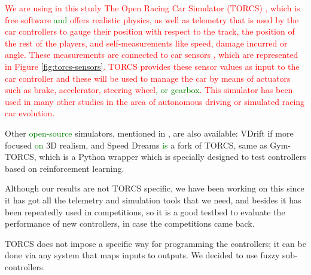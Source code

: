 \documentclass[10pt,journal,compsoc]{IEEEtran}
\begin{document}
\textcolor{red}{
We are using in this study The Open Racing Car Simulator (TORCS) \cite{torcs4}, which is free software \textcolor{green}{and} offers realistic physics, as well as telemetry that is used by the car controllers to gauge their position with respect to the track, the position of the rest of the players, and self-measurements like speed, damage incurred or angle. These measurements are connected to car sensors \cite{torcs5}, which are represented in Figure \ref{fig:torcs-sensors}. TORCS provides these sensor values as input to the car controller and these will be
used to manage the car by means of actuators such as brake, accelerator, steering wheel\textcolor{green}{, or gearbox}. 
This simulator has been used in many other studies in the area of autonomous driving or simulated racing car evolution.}


Other \textcolor{green}{open-source} simulators, mentioned in \cite{Loiacono:2012:LEA:2212908.2212953}, are also available: VDrift
if more focused \textcolor{green}{on} 3D realism, and Speed Dreams \textcolor{green}{is}  a fork of
TORCS, same as Gym-TORCS, which is a Python wrapper which is specially designed to test controllers based on reinforcement learning.

Although our results are not TORCS specific, we have been
working on this since it has got all the telemetry and simulation
tools that we need, and besides it has been repeatedly used in
competitions, so it is a good testbed to evaluate the performance of new controllers, in case the competitions came back.

TORCS does not impose a specific way for programming the controllers;
it can be done via any system that maps inputs to outputs. We decided
to use fuzzy sub-controllers.
\end{document}
